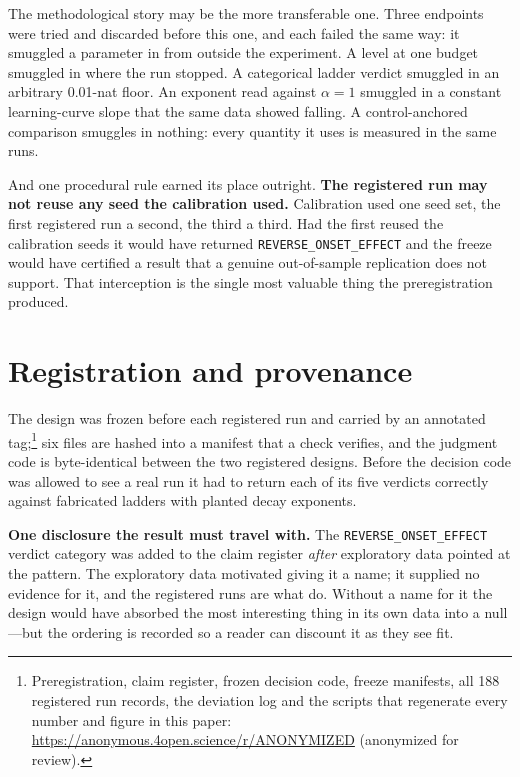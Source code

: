 \documentclass[11pt]{article}
\newcommand{\cond}[1]{\texttt{#1}}
\begin{document}
The methodological story may be the more transferable one. Three endpoints were
tried and discarded before this one, and each failed the same way: it smuggled a
parameter in from outside the experiment. A level at one budget smuggled in where
the run stopped. A categorical ladder verdict smuggled in an arbitrary 0.01-nat
floor. An exponent read against $\alpha = 1$ smuggled in a constant learning-curve
slope that the same data showed falling. A control-anchored comparison smuggles in
nothing: every quantity it uses is measured in the same runs.

And one procedural rule earned its place outright. \textbf{The registered run may
not reuse any seed the calibration used.} Calibration used one seed set, the first
registered run a second, the third a third. Had the first reused the calibration
seeds it would have returned \cond{REVERSE\_ONSET\_EFFECT} and the freeze would
have certified a result that a genuine out-of-sample replication does not support.
That interception is the single most valuable thing the preregistration produced.

\section{Registration and provenance}

The design was frozen before each registered run and carried by an annotated
tag;\footnote{Preregistration, claim register, frozen decision code, freeze
manifests, all 188 registered run records, the deviation log and the scripts that
regenerate every number and figure in this paper:
\url{https://anonymous.4open.science/r/ANONYMIZED} (anonymized for review).}
six files are hashed into a manifest that a check verifies, and the judgment code
is byte-identical between the two registered designs. Before the decision code was
allowed to see a real run it had to return each of its five verdicts correctly
against fabricated ladders with planted decay exponents.

\textbf{One disclosure the result must travel with.} The
\cond{REVERSE\_ONSET\_EFFECT} verdict category was added to the claim register
\emph{after} exploratory data pointed at the pattern. The exploratory data
motivated giving it a name; it supplied no evidence for it, and the registered runs
are what do. Without a name for it the design would have absorbed the most
interesting thing in its own data into a null---but the ordering is recorded so a
reader can discount it as they see fit.
\end{document}
